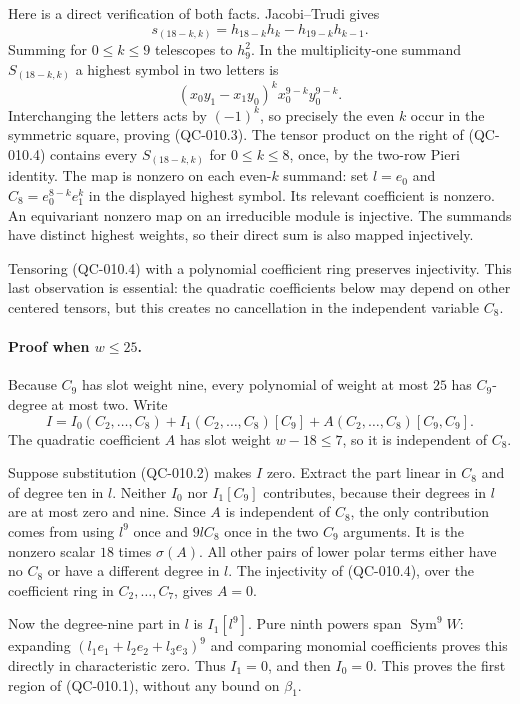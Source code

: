 Here is a direct verification of both facts. Jacobi--Trudi gives
\[
 s_{(18-k,k)}=h_{18-k}h_k-h_{19-k}h_{k-1}.
\]
Summing for $0\leq k\leq9$ telescopes to $h_9^2$.
In the multiplicity-one summand $S_{(18-k,k)}$ a highest
symbol in two letters is
\[
 (x_0y_1-x_1y_0)^k x_0^{9-k}y_0^{9-k}.
\]
Interchanging the letters acts by $(-1)^k$, so precisely the
even $k$ occur in the symmetric square, proving (QC-010.3).
The tensor product on the right of (QC-010.4) contains every
$S_{(18-k,k)}$ for $0\leq k\leq8$, once, by the two-row
Pieri identity. The map is nonzero on each even-$k$ summand:
set $l=e_0$ and $C_8=e_0^{8-k}e_1^k$ in the displayed
highest symbol. Its relevant coefficient is nonzero.
An equivariant nonzero map on an irreducible module is
injective. The summands have distinct highest weights,
so their direct sum is also mapped injectively.

Tensoring (QC-010.4) with a polynomial coefficient ring
preserves injectivity. This last observation is essential:
the quadratic coefficients below may depend on other
centered tensors, but this creates no cancellation in
the independent variable $C_8$.

\paragraph{Proof when $w\leq25$.}
Because $C_9$ has slot weight nine, every polynomial of
weight at most $25$ has $C_9$-degree at most two. Write
\[
 I=I_0(C_2,\ldots,C_8)+I_1(C_2,\ldots,C_8)[C_9]
       +A(C_2,\ldots,C_8)[C_9,C_9].
 \tag{QC-010.5}
\]
The quadratic coefficient $A$ has slot weight $w-18\leq7$,
so it is independent of $C_8$.

Suppose substitution (QC-010.2) makes $I$ zero. Extract
the part linear in $C_8$ and of degree ten in $l$.
Neither $I_0$ nor $I_1[C_9]$ contributes, because their
degrees in $l$ are at most zero and nine. Since $A$ is
independent of $C_8$, the only contribution comes from
using $l^9$ once and $9lC_8$ once in the two $C_9$
arguments. It is the nonzero scalar $18$ times
$\sigma(A)$. All other pairs of lower polar terms either
have no $C_8$ or have a different degree in $l$.
The injectivity of (QC-010.4), over the coefficient ring
in $C_2,\ldots,C_7$, gives $A=0$.

Now the degree-nine part in $l$ is $I_1[l^9]$.
Pure ninth powers span $\operatorname{Sym}^9W$:
expanding $(l_1e_1+l_2e_2+l_3e_3)^9$ and comparing
monomial coefficients proves this directly in
characteristic zero. Thus $I_1=0$, and then $I_0=0$.
This proves the first region of (QC-010.1), without
any bound on $\beta_1$.

